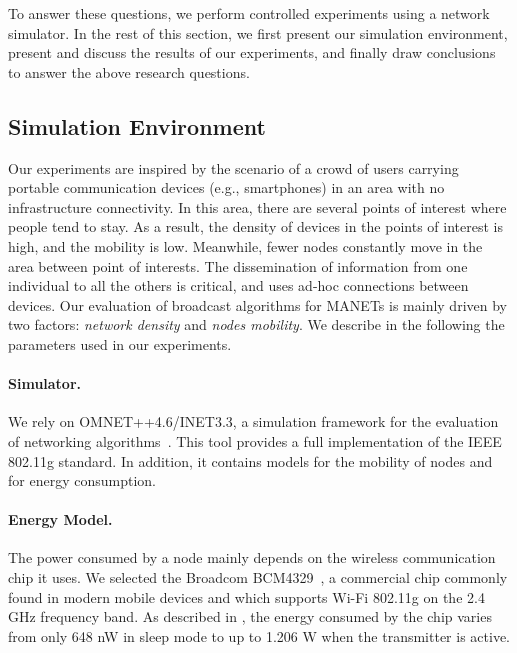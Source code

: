 To answer these questions, we perform controlled experiments using a network simulator.
%
In the rest of this section, we first present our simulation environment, present and discuss the results of our experiments, and finally draw conclusions to answer the above research questions.

\subsection{Simulation Environment}

Our experiments are inspired by the scenario of a crowd of users carrying portable communication devices (e.g., smartphones) in an area with no infrastructure connectivity.
%
In this area, there are several points of interest where people tend to stay.
%
As a result, the density of devices in the points of interest is high, and the mobility is low.
%
Meanwhile, fewer nodes constantly move in the area between point of interests. 
%
The dissemination of information from one individual to all the others is critical, and uses ad-hoc connections between devices.
%
Our evaluation of broadcast algorithms for MANETs is mainly driven by two factors: \emph{network density} and \emph{nodes mobility}.
%
We describe in the following the parameters used in our experiments.


\paragraph{Simulator.}
We rely on OMNET++4.6/INET3.3, a simulation framework for the evaluation of networking algorithms~\cite{Varga:2008:OOS:1416222.1416290}.
%
This tool provides a full implementation of the IEEE 802.11g standard.
%
In addition, it contains models for the mobility of nodes and for energy consumption.


\paragraph{Energy Model.}
%
The power consumed by a node mainly depends on the wireless communication chip it uses.
%
We selected the Broadcom BCM4329~\cite{BCM4329}, a commercial chip commonly found in modern mobile devices and which supports Wi-Fi 802.11g on the 2.4 GHz frequency band. As described in , the energy consumed by the chip varies from only 648 nW in sleep mode to up to 1.206 W when the transmitter is active.

